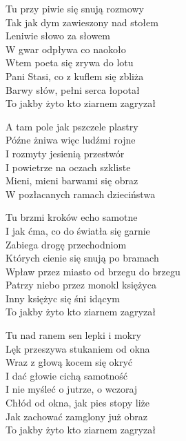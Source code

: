\begin{textn}
    \ifchorded{\hfill\break}
    Tu przy piwie się snują rozmowy\\
    Tak jak dym zawieszony nad stołem\\
    Leniwie słowo za słowem\\
    W gwar odpływa co naokoło\\
    Wtem poeta się zrywa do lotu\\
    Pani Stasi, co z kuflem się zbliża\\
    Barwy słów, pełni serca łopotał\\
    To jakby żyto kto ziarnem zagryzał

    \vin A tam pole jak pszczele plastry\\
    \vin Późne żniwa więc ludźmi rojne\\
    \vin I rozmyty jesienią przestwór\\
    \vin I powietrze na oczach szkliste\\
    \vin Mieni, mieni barwami się obraz\\
    \vin W pozłacanych ramach dzieciństwa

    Tu brzmi kroków echo samotne\\
    I jak ćma, co do światła się garnie\\
    Zabiega drogę przechodniom\\
    Których cienie się snują po bramach\\
    Wpław przez miasto od brzegu do brzegu\\
    Patrzy niebo przez monokl księżyca\\
    Inny księżyc się śni idącym\\
    To jakby żyto kto ziarnem zagryzał

    Tu nad ranem sen lepki i mokry\\
    Lęk przeszywa stukaniem od okna\\
    Wraz z głową kocem się okryć\\
    I dać głowie cichą samotność\\
    I nie myśleć o jutrze, o wczoraj\\
    Chłód od okna, jak pies stopy liże\\
    Jak zachować zamglony już obraz\\
    To jakby żyto kto ziarnem zagryzał
\end{textn}
